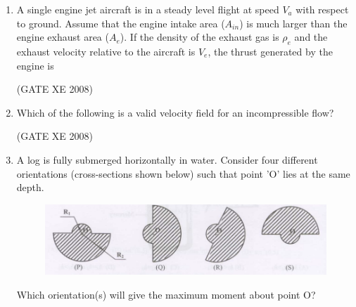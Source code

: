 \documentclass[12pt]{article}
\begin{document}
\begin{enumerate}
(GATE XE 2008)
\item A single engine jet aircraft is in a steady level flight at speed $V_a$ with respect to ground. Assume that the engine intake area ($A_{in}$) is much larger than the engine exhaust area ($A_e$). If the density of the exhaust gas is $\rho _e$ and the exhaust velocity relative to the aircraft is $V_e$, the thrust generated by
the engine is

\begin{enumerate}
\end{enumerate}

(GATE XE 2008)
\item Which of the following is a valid velocity field for an incompressible flow?

\begin{enumerate}
\end{enumerate}

(GATE XE 2008)
\item A log is fully submerged horizontally in water. Consider four different orientations (cross-sections shown below) such that point 'O' lies at the same depth.

\begin{figure}[H]
\centering
  \includegraphics[width=0.7\columnwidth]{figs/ass1_d_q24.png}
  \caption{}
\end{figure} 

Which orientation(s) will give the maximum moment about point O?


\end{enumerate}
\end{document}
